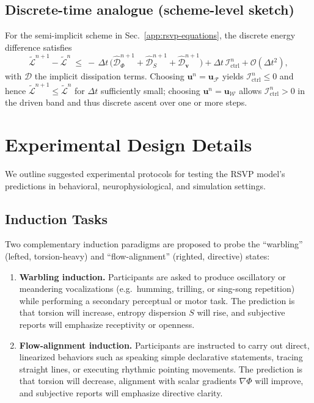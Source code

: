 \documentclass[a4paper,11pt]{article}
\begin{document}
\subsection{Discrete-time analogue (scheme-level sketch)}
For the semi-implicit scheme in Sec.~\ref{app:rsvp-equations}, the discrete
energy difference satisfies
\[
\widetilde{\mathcal{L}}^{n+1}-\widetilde{\mathcal{L}}^{n}
\ \le\
-\,\Delta t\,\Big(\widehat{\mathcal{D}}_\Phi^{n+1}
+\widehat{\mathcal{D}}_S^{n+1}
+\widehat{\mathcal{D}}_{\mathbf v}^{n+1}\Big)
+\Delta t\,\mathcal{I}_{\mathrm{ctrl}}^{n}
+\mathcal O(\Delta t^2),
\]
with $\widehat{\mathcal{D}}$ the implicit dissipation terms. Choosing
$\mathbf u^n=\mathbf u_{\mathcal F}$ yields
$\mathcal{I}_{\mathrm{ctrl}}^{n}\le 0$ and hence
$\widetilde{\mathcal{L}}^{n+1}\le \widetilde{\mathcal{L}}^{n}$ for $\Delta t$
sufficiently small; choosing $\mathbf u^n=\mathbf u_{\mathcal W}$ allows
$\mathcal{I}_{\mathrm{ctrl}}^{n}>0$ in the driven band and thus discrete ascent
over one or more steps.
\qedhere

\section{Experimental Design Details}
\label{app:experimental-details}

We outline suggested experimental protocols for testing the RSVP model's
predictions in behavioral, neurophysiological, and simulation settings.

\subsection{Induction Tasks}
Two complementary induction paradigms are proposed to probe the ``warbling''
(lefted, torsion-heavy) and ``flow-alignment'' (righted, directive) states:

\begin{enumerate}
\item \textbf{Warbling induction.} Participants are asked to produce
oscillatory or meandering vocalizations (e.g.\ humming, trilling, or
sing-song repetition) while performing a secondary perceptual or motor task.
The prediction is that torsion will increase, entropy dispersion $S$ will rise,
and subjective reports will emphasize receptivity or openness.

\item \textbf{Flow-alignment induction.} Participants are instructed to carry
out direct, linearized behaviors such as speaking simple declarative
statements, tracing straight lines, or executing rhythmic pointing movements.
The prediction is that torsion will decrease, alignment with scalar gradients
$\nabla \Phi$ will improve, and subjective reports will emphasize directive
clarity.
\end{enumerate}
\end{document}
